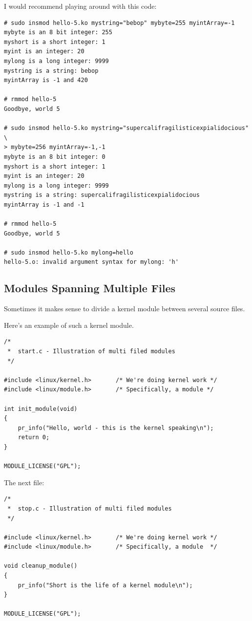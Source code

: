 \documentclass[11pt]{article}
\begin{document}
I would recommend playing around with this code:

\begin{verbatim}
# sudo insmod hello-5.ko mystring="bebop" mybyte=255 myintArray=-1
mybyte is an 8 bit integer: 255
myshort is a short integer: 1
myint is an integer: 20
mylong is a long integer: 9999
mystring is a string: bebop
myintArray is -1 and 420

# rmmod hello-5
Goodbye, world 5

# sudo insmod hello-5.ko mystring="supercalifragilisticexpialidocious" \
> mybyte=256 myintArray=-1,-1
mybyte is an 8 bit integer: 0
myshort is a short integer: 1
myint is an integer: 20
mylong is a long integer: 9999
mystring is a string: supercalifragilisticexpialidocious
myintArray is -1 and -1

# rmmod hello-5
Goodbye, world 5

# sudo insmod hello-5.ko mylong=hello
hello-5.o: invalid argument syntax for mylong: 'h'
\end{verbatim}

\subsection{Modules Spanning Multiple Files}
\label{sec:orge7cc767}
Sometimes it makes sense to divide a kernel module between several source files.

Here's an example of such a kernel module.

\begin{verbatim}
/*
 *  start.c - Illustration of multi filed modules
 */

#include <linux/kernel.h>       /* We're doing kernel work */
#include <linux/module.h>       /* Specifically, a module */

int init_module(void)
{
    pr_info("Hello, world - this is the kernel speaking\n");
    return 0;
}

MODULE_LICENSE("GPL");
\end{verbatim}

The next file:

\begin{verbatim}
/*
 *  stop.c - Illustration of multi filed modules
 */

#include <linux/kernel.h>       /* We're doing kernel work */
#include <linux/module.h>       /* Specifically, a module  */

void cleanup_module()
{
    pr_info("Short is the life of a kernel module\n");
}

MODULE_LICENSE("GPL");
\end{verbatim}
\end{document}
